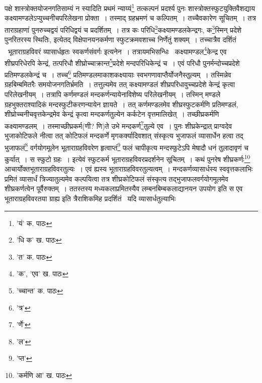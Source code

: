 \documentclass[11pt, openany]{book}
\begin{document}
{{{{{\vspace{0.3cm}
\noindent पक्षे शास्त्रोक्तयोजनगतिसाम्यं न स्यादिति प्रथमं न्याय्यं\renewcommand{\thefootnote}{१}\footnote{'यं' क. पाठः} तत्कल्पनं प्रदर्श्य पुनः शास्त्रोक्तस्फुटयुक्तिवैशद्याय कक्ष्यामण्डलेऽप्युच्चनीचपरिलेखना प्रोक्ता~। तस्माद् ग्रहभ्रमणं च कल्पितम्~। तच्चैवकारेण सूचितम्~। तत्र ताराग्रहाणां पुनरुच्चद्वयं परिधिद्वयं च प्रदर्शितम्~। तत्र कः परिधि\renewcommand{\thefootnote}{२}\footnote{'धि क' ख. पाठः}कक्ष्यामण्डलकेन्द्रगः, क\renewcommand{\thefootnote}{३}\footnote{'त' क. पाठः}स्मिन् प्रदेशे पुनरितरस्य स्थितिः, इत्येतद् विक्षेपानयनकर्मणा स्फुटक्रमवशाच्च निर्णेतुं शक्यम्~। तच्चात्रैव दर्शितं \textendash\ {\qt भूताराग्रहविवरं
व्यासार्धहृतः स्वकर्णसंवर्गः} इत्यनेन~। तत्रायमभिसन्धिः \textendash\ कक्ष्यामण्डल\renewcommand{\thefootnote}{४}\footnote{'क', 'एव' ख. पाठः}केन्द्र एव शीघ्रपरिधेरपि केन्द्रं, तत्परिधौ शीघ्रोच्चाक्रान्त\renewcommand{\thefootnote}{५}\footnote{'च्चान्त' क. पाठः}प्रदेशे
मन्दपरिधिकेन्द्रं च~। एवं परिधौ पुनर्मन्दोच्चप्रदेशे प्रतिमण्डलकेन्द्रं च~। तच्च\renewcommand{\thefootnote}{६}\footnote{'त्र'} प्रतिमण्डलमाकाशकक्ष्यायाः स्वभगणावाप्तैर्योजनैस्तुल्यम्~। तस्मिन्नेव ग्रहबिम्बमितरैः समयोजनगतिर्भ्रमति~। तत्तुल्यमेव तत् कक्ष्यामण्डलं शीघ्रपरिधावुच्चप्रदेशे केन्द्रं कृत्वा परिलेखनीयम्~। तत्रापि कर्णमण्डलं मन्दकर्णन्यायेनाविशेष्य परिलेखनीयम्~। तस्मिन् मण्डले ग्रहभुक्तराश्यादिकं मन्दस्फुटीकरणन्यायेन ज्ञायते~। तत् कर्णमण्डलमेव शीघ्रस्फुटकर्मणि प्रतिमण्डलं, शीघ्रोच्चनीचवृत्तकेन्द्रमेव केन्द्रं कृत्वा मन्दकर्णतुल्येन कर्कटेन वृत्तमालिखेत्~। तच्छीघ्रकर्मणि कक्ष्यामण्डलम्~। तस्माच्छीघ्रकर्म(णी? णि)ते उभे मन्दकर्ण\renewcommand{\thefootnote}{७}\footnote{'र्णे'}तुल्ये एव~। पुनः
शीघ्रकेन्द्रात् प्राग्वदेव भुजाकोटिफले नीत्वा तत् कोटिफलं मन्दकर्णे मृगकर्क्यादिवशात् संस्कृत्य भुजाफलं व्यासार्धेन हत्वा तद् भुजाफलं\renewcommand{\thefootnote}{८}\footnote{'ल'} वर्गयोगमूलेन भूताराग्रहविवरेण हृत्वाप्तं\renewcommand{\thefootnote}{९}\footnote{'प्त'} फलं चापीकृत्य मन्दस्फुटेऽपि मेषादौ धनं
तुलादावृणं च कुर्यात्~। स स्फुटो ग्रहः~। इत्येवं स्फुटकर्म भूताराग्रहविवरप्रदर्शनेन सूचितम्~। कथं पुनरेष शीघ्रकर्णः\renewcommand{\thefootnote}{१०}\footnote{'कर्मणि आ' ख. पाठः} आचार्योक्तभूताराग्रहविवरतुल्यः~।
एवं ह्यस्य भूताराग्रहविवरतुल्यत्वम्~। मन्दकर्णव्यासार्धस्य स्ववृत्तकलाभिः प्रमितं व्यासार्धं त्रिज्यातुल्यमेव कल्पयित्वा तत्र शीघ्रकोटिफलं संस्कृत्य
तद्भुजाफलवर्गयोगमूलमेव शीघ्रकर्णत्वेन पूर्वैरुक्तम्~। ततस्तस्य मध्यकलाप्रमितस्यैव लम्बनबिम्बकलाद्यानयन उपयोग इति स एव भूताराग्रहविवरतया ग्राह्य इति त्रैराशिकमिह प्रदर्शितं \textendash\ यदि व्यासार्धतुल्याभिः

\newpage

}}}}}
\end{document}
